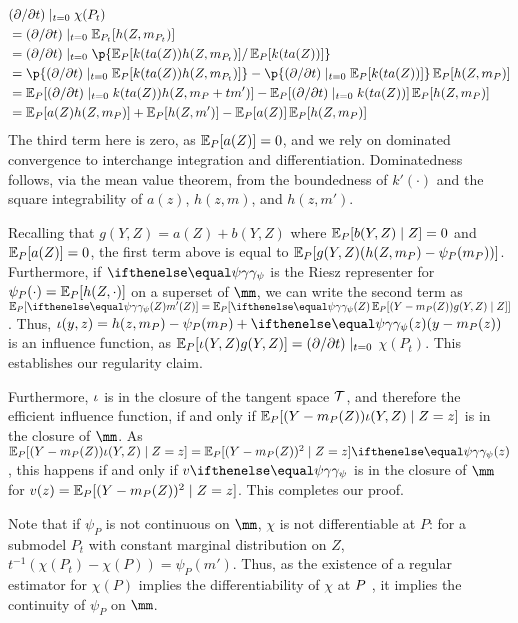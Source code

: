 \begin{align*}
&(\partial/\partial t)\mid_{t=0} \chi(P_t) \\ 
&= (\partial/\partial t) \mid_{t=0}   \E_{P_t}[ h(Z,m_{P_t}) ]  \\
&= (\partial/\partial t) \mid_{t=0} \p{  \E_{P}[ k(ta(Z)) h(Z,m_{P_t})] / \E_{P}[ k(ta(Z))] } \\
&=  \p{ (\partial/\partial t) \mid_{t=0} \E_{P}[ k(ta(Z)) h(Z,m_{P_t}) ] } -  \p{(\partial/\partial t)\mid_{t=0}\E_P[ k(ta(Z))]}\E_{P}[ h(Z,m_{P}) ] \\
&= \E_{P}[ (\partial/\partial t)\mid_{t=0}  k(ta(Z)) h(Z,m_P + t m') ] - \E_P[ (\partial/\partial t)\mid_{t=0} k(ta(Z))]\E_{P}[ h(Z,m_{P}) ] \\
&= \E_P[ a(Z) h(Z, m_P)] + \E_P[ h(Z, m') ] - \E_P[a(Z)]\E_{P}[ h(Z,m_{P}) ]
\end{align*}
The third term here is zero, as $\E_P[a(Z)]=0$, and we rely on dominated convergence to interchange integration and differentiation.
Dominatedness follows, via the mean value theorem, from the boundedness of $k'(\cdot)$ and the square integrability of $a(z)$,
 $h(z,m)$, and $h(z,m')$. 

Recalling that $g(Y,Z)=a(Z) + b(Y,Z)$ where $\E_P[b(Y,Z) \mid Z] = 0$ and $\E_P[a(Z)]=0$, 
the first term above is equal to $\E_P[ g(Y,Z) (h(Z,m_P) - \psi_P(m_P))]$.
Furthermore, if $\riesz[\psi]$ is the Riesz representer for $\psi_P(\cdot) = \E_P[ h(Z, \cdot)]$ on a superset of $\mm$, we can write the second term as 
$\E_P[\riesz[\psi](Z) m'(Z)]= \E_P[\riesz[\psi](Z) \E_P[(Y - m_P(Z)) g(Y,Z) \mid Z]]$. 
Thus, $\influence(y,z) = h(z,m_P) - \psi_P(m_P) + \riesz[\psi](z)(y-m_P(z))$ is an influence function, as 
$\E_P[ \influence(Y,Z) g(Y,Z)]=(\partial/\partial t)\mid_{t=0}$ $\chi(P_t)$. This establishes our regularity claim.

Furthermore, $\iota$ is in the closure of the tangent space $\mathcal{T}$, and therefore the efficient influence function,
 if and only if $\E_P[ (Y-m_P(Z)) \influence(Y,Z) \mid Z=z]$ is in the closure of $\mm$.
As $\E_P[ (Y-m_P(Z)) \influence(Y,Z) \mid Z=z] = \E_P[(Y-m_P(Z))^2 \mid Z=z] \riesz[\psi](z)$,
this happens if and only if $v \riesz[\psi]$ is in the closure of $\mm$ for $v(z) = \E_P[(Y-m_P(Z))^2 \mid Z=z]$. 
This completes our proof.

Note that if $\psi_P$ is not continuous on $\mm$, $\chi$ is not differentiable at $P$:
for a submodel $P_t$ with constant marginal distribution on $Z$, $t^{-1}(\chi(P_t)-\chi(P)) = \psi_P(m')$.
Thus, as the existence of a regular estimator for $\chi(P)$ implies the differentiability of $\chi$ at $\P$ \citep[Theorem 2.1]{van1991differentiable}, 
it implies the continuity of $\psi_P$ on $\mm$. 

